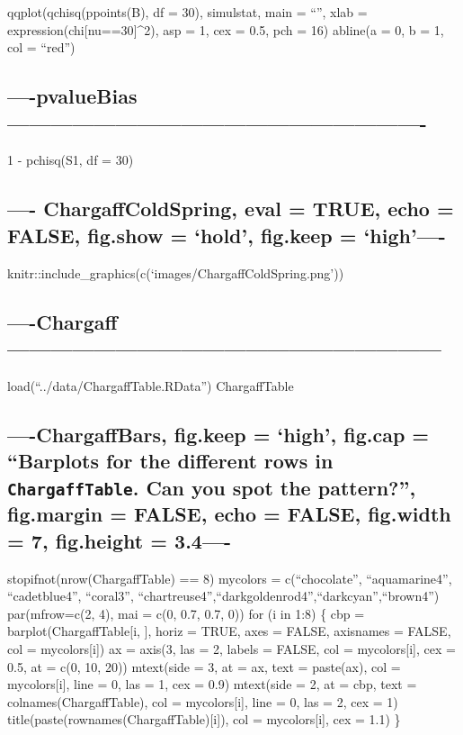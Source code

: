 \documentclass[]{article}
\begin{document}
qqplot(qchisq(ppoints(B), df = 30), simulstat, main = ``'', xlab =
expression(chi{[}nu==30{]}\^{}2), asp = 1, cex = 0.5, pch = 16) abline(a
= 0, b = 1, col = ``red'')

\subsection{----pvalueBias----------------------------------------------------------}\label{pvaluebias-}

1 - pchisq(S1, df = 30)

\subsection{\texorpdfstring{---- ChargaffColdSpring, eval = TRUE, echo =
FALSE, fig.show = `hold', fig.keep =
`high'----}{---- ChargaffColdSpring, eval = TRUE, echo = FALSE, fig.show = hold, fig.keep = high----}}\label{chargaffcoldspring-eval-true-echo-false-fig.show-hold-fig.keep-high-}

knitr::include\_graphics(c(`images/ChargaffColdSpring.png'))

\subsection{----Chargaff------------------------------------------------------------}\label{chargaff}

load(``../data/ChargaffTable.RData'') ChargaffTable

\subsection{\texorpdfstring{----ChargaffBars, fig.keep = `high', fig.cap
= ``Barplots for the different rows in \texttt{ChargaffTable}. Can you
spot the pattern?'', fig.margin = FALSE, echo = FALSE, fig.width = 7,
fig.height =
3.4----}{----ChargaffBars, fig.keep = high, fig.cap = Barplots for the different rows in ChargaffTable. Can you spot the pattern?, fig.margin = FALSE, echo = FALSE, fig.width = 7, fig.height = 3.4----}}\label{chargaffbars-fig.keep-high-fig.cap-barplots-for-the-different-rows-in-chargafftable.-can-you-spot-the-pattern-fig.margin-false-echo-false-fig.width-7-fig.height-3.4-}

stopifnot(nrow(ChargaffTable) == 8) mycolors = c(``chocolate'',
``aquamarine4'', ``cadetblue4'', ``coral3'',
``chartreuse4'',``darkgoldenrod4'',``darkcyan'',``brown4'')
par(mfrow=c(2, 4), mai = c(0, 0.7, 0.7, 0)) for (i in 1:8) \{ cbp =
barplot(ChargaffTable{[}i, {]}, horiz = TRUE, axes = FALSE, axisnames =
FALSE, col = mycolors{[}i{]}) ax = axis(3, las = 2, labels = FALSE, col
= mycolors{[}i{]}, cex = 0.5, at = c(0, 10, 20)) mtext(side = 3, at =
ax, text = paste(ax), col = mycolors{[}i{]}, line = 0, las = 1, cex =
0.9) mtext(side = 2, at = cbp, text = colnames(ChargaffTable), col =
mycolors{[}i{]}, line = 0, las = 2, cex = 1)
title(paste(rownames(ChargaffTable){[}i{]}), col = mycolors{[}i{]}, cex
= 1.1) \}
\end{document}
